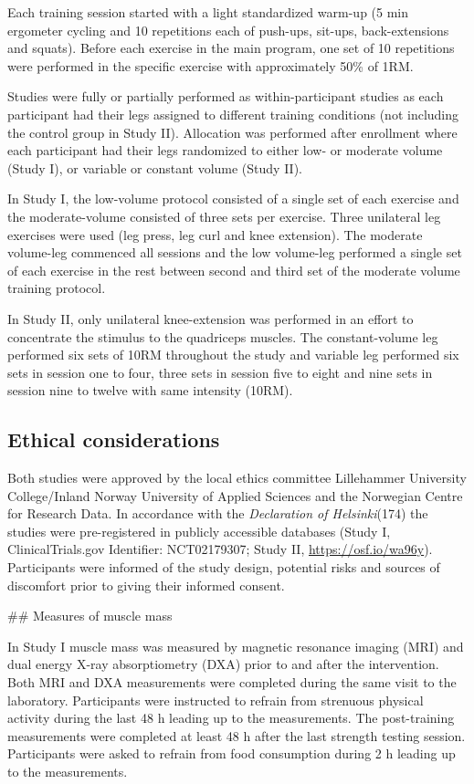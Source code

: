 \documentclass[twoside,10pt]{gihclass} %
\begin{document}
Each training session started with a light standardized warm-up (5 min
ergometer cycling and 10 repetitions each of push-ups, sit-ups,
back-extensions and squats). Before each exercise in the main program,
one set of 10 repetitions were performed in the specific exercise with
approximately 50\% of 1RM.

Studies were fully or partially performed as within-participant studies
as each participant had their legs assigned to different training
conditions (not including the control group in Study II). Allocation was
performed after enrollment where each participant had their legs
randomized to either low- or moderate volume (Study I), or variable or
constant volume (Study II).

In Study I, the low-volume protocol consisted of a single set of each
exercise and the moderate-volume consisted of three sets per exercise.
Three unilateral leg exercises were used (leg press, leg curl and knee
extension). The moderate volume-leg commenced all sessions and the low
volume-leg performed a single set of each exercise in the rest between
second and third set of the moderate volume training protocol.

In Study II, only unilateral knee-extension was performed in an effort
to concentrate the stimulus to the quadriceps
muscles. The constant-volume leg performed six sets
of 10RM throughout the study and variable leg performed six sets in
session one to four, three sets in session five to eight and nine sets
in session nine to twelve with same intensity (10RM).

\hypertarget{ethical-considerations}{%
\subsection{Ethical considerations}\label{ethical-considerations}}

Both studies were approved by the local ethics committee Lillehammer
University College/Inland Norway University of Applied Sciences and the
Norwegian Centre for Research Data. In accordance with the \emph{Declaration
of Helsinki}(174) the studies were pre-registered in publicly
accessible databases (Study I, ClinicalTrials.gov Identifier:
NCT02179307; Study II, \url{https://osf.io/wa96y}). Participants were
informed of the study design, potential risks and sources of discomfort
prior to giving their informed consent.

\#\# Measures of muscle mass

In Study I muscle mass was measured by magnetic resonance imaging (MRI)
and dual energy X-ray absorptiometry (DXA) prior to and after the
intervention. Both MRI and DXA measurements were completed during the
same visit to the laboratory. Participants were instructed to refrain
from strenuous physical activity during the last 48 h leading up to the
measurements. The post-training measurements were completed at least 48
h after the last strength testing session. Participants were asked to
refrain from food consumption during 2 h leading up to the measurements.
\end{document}
